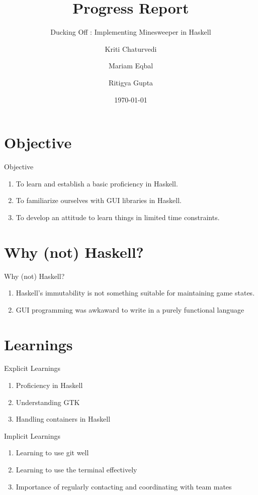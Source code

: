 \documentclass{beamer}
\title{Progress Report}
\subtitle{Ducking Off : Implementing Minesweeper in Haskell}
\author{Kriti Chaturvedi \and Mariam Eqbal \and Ritigya Gupta}
\date{\today}
\begin{document}
\begin{frame}
    \titlepage 
\end{frame}

\section{Objective}
\begin{frame}{Objective}
    \begin{enumerate}
        \item To learn and establish a basic proficiency in Haskell.
        \item To familiarize ourselves with GUI libraries in Haskell.
        \item To develop an attitude to learn things in limited time constraints.
    \end{enumerate}
\end{frame}

\section{Why (not) Haskell?}
\begin{frame}{Why (not) Haskell?}
    \begin{enumerate}
        \item Haskell's immutability is not something suitable for maintaining game states.
        \item GUI programming was awkaward to write in a purely functional language
    \end{enumerate}
\end{frame}

\section{Learnings}

\begin{frame}{Explicit Learnings}
    \begin{enumerate}
        \item Proficiency in Haskell
        \item Understanding GTK
        \item Handling containers in Haskell
    \end{enumerate}
\end{frame}

\begin{frame}{Implicit Learnings}
    \begin{enumerate}
        \item Learning to use git well
        \item Learning to use the terminal effectively
        \item Importance of regularly contacting and coordinating with team mates
    \end{enumerate}
\end{frame}
\end{document}
